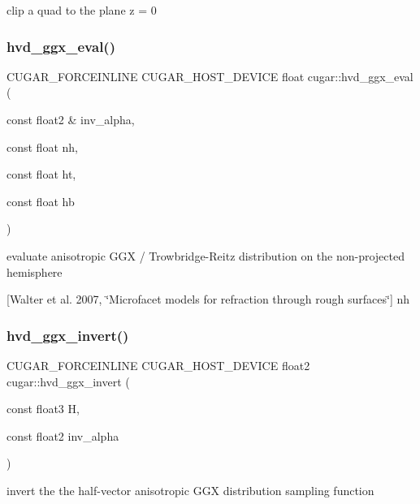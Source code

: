 clip a quad to the plane z = 0 \mbox{\label{group___b_s_d_f_module_ga985268a447aa898cd2f2e1c792d9ddff}} 
\subsubsection{\texorpdfstring{hvd\+\_\+ggx\+\_\+eval()}{hvd\_ggx\_eval()}}
{\footnotesize\ttfamily C\+U\+G\+A\+R\+\_\+\+F\+O\+R\+C\+E\+I\+N\+L\+I\+NE C\+U\+G\+A\+R\+\_\+\+H\+O\+S\+T\+\_\+\+D\+E\+V\+I\+CE float cugar\+::hvd\+\_\+ggx\+\_\+eval (\begin{DoxyParamCaption}\item[{const float2 \&}]{inv\+\_\+alpha,  }\item[{const float}]{nh,  }\item[{const float}]{ht,  }\item[{const float}]{hb }\end{DoxyParamCaption})}

evaluate anisotropic G\+GX / Trowbridge-\/\+Reitz distribution on the non-\/projected hemisphere

\mbox{[}Walter et al. 2007, \char`\"{}\+Microfacet models for refraction through rough surfaces\char`\"{}\mbox{]} nh \mbox{\label{group___b_s_d_f_module_ga009dbdc5ba0035fc161335607c2b328d}} 
\subsubsection{\texorpdfstring{hvd\+\_\+ggx\+\_\+invert()}{hvd\_ggx\_invert()}}
{\footnotesize\ttfamily C\+U\+G\+A\+R\+\_\+\+F\+O\+R\+C\+E\+I\+N\+L\+I\+NE C\+U\+G\+A\+R\+\_\+\+H\+O\+S\+T\+\_\+\+D\+E\+V\+I\+CE float2 cugar\+::hvd\+\_\+ggx\+\_\+invert (\begin{DoxyParamCaption}\item[{const float3}]{H,  }\item[{const float2}]{inv\+\_\+alpha }\end{DoxyParamCaption})}

invert the the half-\/vector anisotropic G\+GX distribution sampling function \mbox{\label{group___b_s_d_f_module_ga49eab615e64e73c409bb285fd95c56c3}} 
